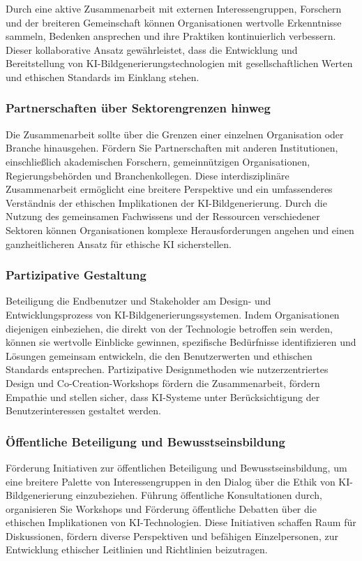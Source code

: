\documentclass[12pt]{report}
\begin{document}
Durch eine aktive Zusammenarbeit mit externen Interessengruppen, Forschern und der breiteren Gemeinschaft können Organisationen wertvolle Erkenntnisse sammeln, Bedenken ansprechen und ihre Praktiken kontinuierlich verbessern. Dieser kollaborative Ansatz gewährleistet, dass die Entwicklung und Bereitstellung von KI-Bildgenerierungstechnologien mit gesellschaftlichen Werten und ethischen Standards im Einklang stehen.\cite{EUCommision}\cite{UNESCO}

\subsubsection{Partnerschaften über Sektorengrenzen hinweg}
Die Zusammenarbeit sollte über die Grenzen einer einzelnen Organisation oder Branche hinausgehen. Fördern Sie Partnerschaften mit anderen Institutionen, einschließlich akademischen Forschern, gemeinnützigen Organisationen, Regierungsbehörden und Branchenkollegen. Diese interdisziplinäre Zusammenarbeit ermöglicht eine breitere Perspektive und ein umfassenderes Verständnis der ethischen Implikationen der KI-Bildgenerierung. Durch die Nutzung des gemeinsamen Fachwissens und der Ressourcen verschiedener Sektoren können Organisationen komplexe Herausforderungen angehen und einen ganzheitlicheren Ansatz für ethische KI sicherstellen.
\cite{Vogel}
\subsubsection{Partizipative Gestaltung}
Beteiligung die Endbenutzer und Stakeholder am Design- und Entwicklungsprozess von KI-Bildgenerierungssystemen. Indem Organisationen diejenigen einbeziehen, die direkt von der Technologie betroffen sein werden, können sie wertvolle Einblicke gewinnen, spezifische Bedürfnisse identifizieren und Lösungen gemeinsam entwickeln, die den Benutzerwerten und ethischen Standards entsprechen. Partizipative Designmethoden wie nutzerzentriertes Design und Co-Creation-Workshops fördern die Zusammenarbeit, fördern Empathie und stellen sicher, dass KI-Systeme unter Berücksichtigung der Benutzerinteressen gestaltet werden.
\cite{Zytko}
\subsubsection{Öffentliche Beteiligung und Bewusstseinsbildung}
Förderung Initiativen zur öffentlichen Beteiligung und Bewusstseinsbildung, um eine breitere Palette von Interessengruppen in den Dialog über die Ethik von KI-Bildgenerierung einzubeziehen. Führung öffentliche Konsultationen durch, organisieren Sie Workshops und Förderung öffentliche Debatten über die ethischen Implikationen von KI-Technologien. Diese Initiativen schaffen Raum für Diskussionen, fördern diverse Perspektiven und befähigen Einzelpersonen, zur Entwicklung ethischer Leitlinien und Richtlinien beizutragen.
\cite{WILSON2022101652}
\end{document}
